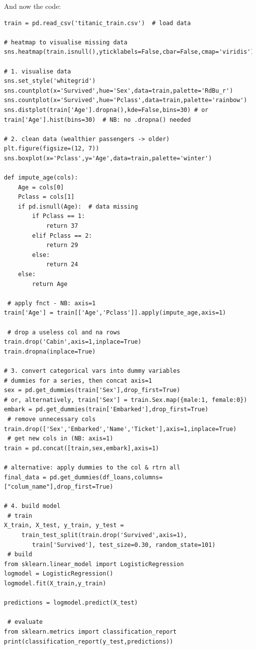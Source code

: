 \documentclass[11pt]{article}
\begin{document}
And now the code:
\begin{lstlisting}
train = pd.read_csv('titanic_train.csv')  # load data

# heatmap to visualise missing data
sns.heatmap(train.isnull(),yticklabels=False,cbar=False,cmap='viridis')

# 1. visualise data
sns.set_style('whitegrid')
sns.countplot(x='Survived',hue='Sex',data=train,palette='RdBu_r')
sns.countplot(x='Survived',hue='Pclass',data=train,palette='rainbow')
sns.distplot(train['Age'].dropna(),kde=False,bins=30) # or
train['Age'].hist(bins=30)  # NB: no .dropna() needed

# 2. clean data (wealthier passengers -> older)
plt.figure(figsize=(12, 7))
sns.boxplot(x='Pclass',y='Age',data=train,palette='winter')

def impute_age(cols):
	Age = cols[0]
	Pclass = cols[1]
	if pd.isnull(Age):  # data missing
		if Pclass == 1:
			return 37
		elif Pclass == 2:
			return 29
		else:
			return 24
	else:
		return Age

 # apply fnct - NB: axis=1
train['Age'] = train[['Age','Pclass']].apply(impute_age,axis=1)

 # drop a useless col and na rows
train.drop('Cabin',axis=1,inplace=True)
train.dropna(inplace=True)

# 3. convert categorical vars into dummy variables 
# dummies for a series, then concat axis=1
sex = pd.get_dummies(train['Sex'],drop_first=True)
# or, alternatively, train['Sex'] = train.Sex.map({male:1, female:0})
embark = pd.get_dummies(train['Embarked'],drop_first=True)
 # remove unnecessary cols
train.drop(['Sex','Embarked','Name','Ticket'],axis=1,inplace=True)
 # get new cols in (NB: axis=1)
train = pd.concat([train,sex,embark],axis=1)

# alternative: apply dummies to the col & rtrn all
final_data = pd.get_dummies(df_loans,columns=["colum_name"],drop_first=True)

# 4. build model
 # train
X_train, X_test, y_train, y_test = 
	 train_test_split(train.drop('Survived',axis=1), 
		train['Survived'], test_size=0.30, random_state=101)
 # build 		
from sklearn.linear_model import LogisticRegression
logmodel = LogisticRegression()
logmodel.fit(X_train,y_train)

predictions = logmodel.predict(X_test)

 # evaluate
from sklearn.metrics import classification_report
print(classification_report(y_test,predictions))
\end{lstlisting}
\end{document}
